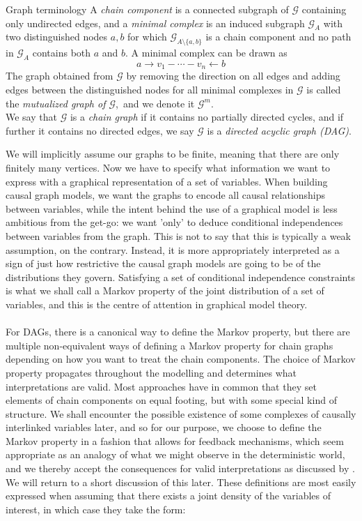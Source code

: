 \documentclass[11pt, a4paper]{memoir}
\theoremstyle{break}
\theoremstyle{break}
\theoremstyle{nonumberplain}
\begin{document}
\begin{mydefinition}{Graph terminology}
A \emph{chain component} is a connected  subgraph of $\mathcal{G}$ containing only undirected edges, and a \emph{minimal complex}  is an induced subgraph $\mathcal{G}_A$ with two distinguished nodes $a,b$ for which $\mathcal{G}_{A\setminus \{a,b\}}$ is a chain component and no path in $\mathcal{G}_A$ contains both $a$ and $b$. A minimal complex can be drawn as
$$a\to v_1-\cdots-v_n\gets b$$
The graph obtained from $\mathcal{G}$ by removing the direction on all edges and adding edges between the distinguished nodes for all minimal complexes in $\mathcal{G}$ is called the \emph{mutualized graph of $\mathcal{G}$},\footnotemark\ and we denote it $\mathcal{G}^m$.\\[5pt]
We say that $\mathcal{G}$ is a \emph{chain graph} if it contains no partially directed cycles, and if further it contains no directed edges, we say $\mathcal{G}$ is a \emph{directed acyclic graph (DAG)}.
\end{mydefinition}
We will implicitly assume our graphs to be finite, meaning that there are only finitely many vertices. Now we have to specify what information we want to express with a graphical representation of a set of variables. When building causal graph models, we want the graphs to encode all causal relationships between variables, while the intent behind the use of a graphical model is less ambitious from the get-go: we want 'only' to deduce conditional independences between variables from the graph. This is not to say that this is typically a weak assumption, on the contrary. Instead, it is more appropriately interpreted as a sign of just how restrictive the causal graph models are going to be of the distributions they govern. Satisfying a set of conditional independence constraints is what we shall call a Markov property of the joint distribution of a set of variables, and this is the centre of attention in graphical model theory.\\\\
For DAGs, there is a canonical way to define the Markov property, but there are multiple non-equivalent ways of defining a Markov property for chain graphs depending on how you want to treat the chain components. The choice of Markov property propagates throughout the modelling and determines what interpretations are valid. Most approaches have in common that they set elements of chain components on equal footing, but with some special kind of structure. We shall encounter the possible existence of some complexes of causally interlinked variables later, and so for our purpose, we choose to define the Markov property in a fashion that allows for feedback mechanisms, which seem appropriate as an analogy of what we might observe in the deterministic world, and we thereby accept the consequences for valid interpretations as discussed by \cite{ChainGraph}. We will return to a short discussion of this later. These definitions are most easily expressed when assuming that there exists a joint density of the variables of interest, in which case they take the form:
\end{document}
